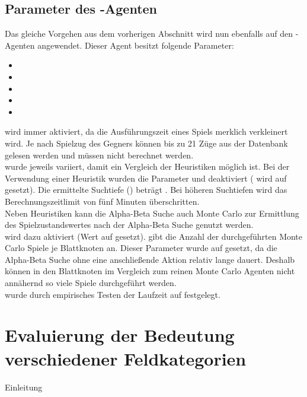 \subsection*{Parameter des -Agenten}
\label{eval:agents:params:subsec-ab}
Das gleiche Vorgehen aus dem vorherigen Abschnitt wird nun ebenfalls auf den -Agenten angewendet.
Dieser Agent besitzt folgende Parameter:
\begin{itemize}
\item {}
\item {}
\item {}
\item {}
\item {}
\end{itemize}
 wird immer aktiviert, da die Ausführungszeit eines Spiels merklich verkleinert wird. Je nach Spielzug des Gegners können bis zu 21 Züge aus der Datenbank  gelesen werden und müssen nicht berechnet werden.
\\ wurde jeweils variiert, damit ein Vergleich der Heuristiken möglich ist. Bei der Verwendung einer Heuristik wurden die Parameter  und  deaktiviert ( wird auf  gesetzt). Die ermittelte Suchtiefe () beträgt . Bei höheren Suchtiefen wird das Berechnungszeitlimit von fünf Minuten überschritten.
\vspace{0.5cm}
\\Neben Heuristiken kann die Alpha-Beta Suche auch Monte Carlo zur Ermittlung des Spielzustandswertes nach der Alpha-Beta Suche genutzt werden.
\\ wird dazu aktiviert (Wert auf  gesetzt).  gibt die Anzahl der durchgeführten Monte Carlo Spiele je Blattknoten an. Dieser Parameter wurde auf  gesetzt, da die Alpha-Beta Suche ohne eine anschließende Aktion relativ lange dauert. Deshalb können in den Blattknoten im Vergleich zum reinen Monte Carlo Agenten nicht annähernd so viele Spiele durchgeführt werden. 
\\ wurde durch empirisches Testen der Laufzeit auf  festgelegt.
\section{Evaluierung der Bedeutung verschiedener Feldkategorien}
Einleitung
